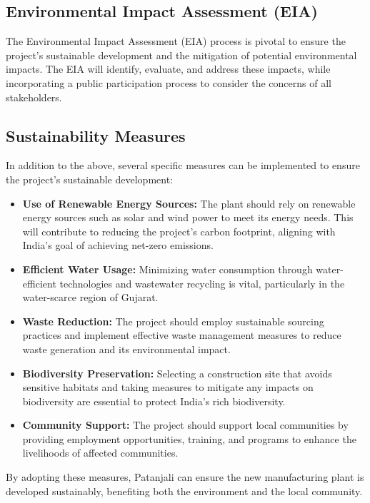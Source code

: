 \subsection{Environmental Impact Assessment (EIA)}
The Environmental Impact Assessment (EIA) process is pivotal to ensure the project's sustainable development and the mitigation of potential environmental impacts. The EIA will identify, evaluate, and address these impacts, while incorporating a public participation process to consider the concerns of all stakeholders.

\subsection{Sustainability Measures}
In addition to the above, several specific measures can be implemented to ensure the project's sustainable development:

\begin{itemize}
\item \textbf{Use of Renewable Energy Sources:} The plant should rely on renewable energy sources such as solar and wind power to meet its energy needs. This will contribute to reducing the project's carbon footprint, aligning with India's goal of achieving net-zero emissions.

\item \textbf{Efficient Water Usage:} Minimizing water consumption through water-efficient technologies and wastewater recycling is vital, particularly in the water-scarce region of Gujarat.

\item \textbf{Waste Reduction:} The project should employ sustainable sourcing practices and implement effective waste management measures to reduce waste generation and its environmental impact.

\item \textbf{Biodiversity Preservation:} Selecting a construction site that avoids sensitive habitats and taking measures to mitigate any impacts on biodiversity are essential to protect India's rich biodiversity.

\item \textbf{Community Support:} The project should support local communities by providing employment opportunities, training, and programs to enhance the livelihoods of affected communities.
\end{itemize}

By adopting these measures, Patanjali can ensure the new manufacturing plant is developed sustainably, benefiting both the environment and the local community.

